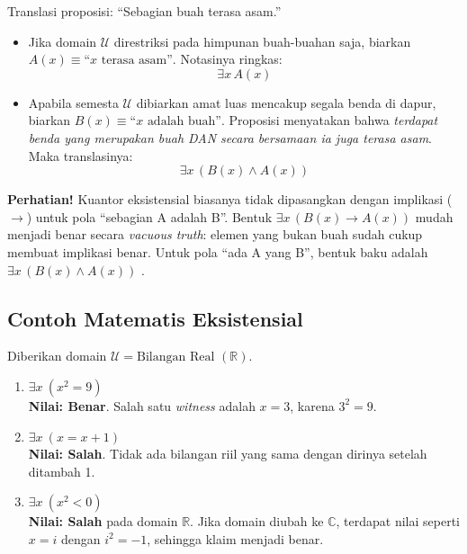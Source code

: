 \begin{contoh}
Translasi proposisi: ``Sebagian buah terasa asam.''
\begin{itemize}
    \item Jika domain $\mathcal{U}$ direstriksi pada himpunan buah-buahan saja, biarkan $A(x) \equiv \text{``}x \text{ terasa asam''}$. Notasinya ringkas:
    \[ \exists x \, A(x) \]
    
    \item Apabila semesta $\mathcal{U}$ dibiarkan amat luas mencakup segala benda di dapur, biarkan $B(x) \equiv \text{``}x \text{ adalah buah''}$. Proposisi menyatakan bahwa \textit{terdapat benda yang merupakan buah DAN secara bersamaan ia juga terasa asam}. Maka translasinya:
    \[ \exists x \, (B(x) \land A(x)) \]
\end{itemize}
\end{contoh}

\begin{catatan}
\textbf{Perhatian!} Kuantor eksistensial biasanya tidak dipasangkan dengan implikasi ($\rightarrow$) untuk pola ``sebagian A adalah B''. Bentuk $\exists x \, (B(x) \rightarrow A(x))$ mudah menjadi benar secara \textit{vacuous truth}: elemen yang bukan buah sudah cukup membuat implikasi benar. Untuk pola ``ada A yang B'', bentuk baku adalah $\exists x \, (B(x) \land A(x))$ \cite{wiki_quantifier_logic}.
\end{catatan}

\subsection{Contoh Matematis Eksistensial}

\begin{contoh}
Diberikan domain $\mathcal{U} = \text{Bilangan Real } (\mathbb{R})$.
\begin{enumerate}
    \item $\exists x \ (x^2 = 9)$ \\ \textbf{Nilai: Benar}. Salah satu \textit{witness} adalah $x = 3$, karena $3^2 = 9$.
    \item $\exists x \ (x = x + 1)$ \\ \textbf{Nilai: Salah}. Tidak ada bilangan riil yang sama dengan dirinya setelah ditambah 1.
    \item $\exists x \ (x^2 < 0)$ \\ \textbf{Nilai: Salah} pada domain $\mathbb{R}$. Jika domain diubah ke $\mathbb{C}$, terdapat nilai seperti $x=i$ dengan $i^2=-1$, sehingga klaim menjadi benar.
\end{enumerate}
\end{contoh}
